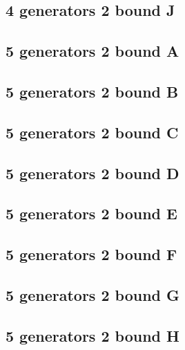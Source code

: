\documentclass{TC}
\begin{document}
{\subsection{4 generators 2 bound J}

\newpage



\subsection{5 generators 2 bound A}

\newpage

\subsection{5 generators 2 bound B}

\newpage

\subsection{5 generators 2 bound C}

\newpage

\subsection{5 generators 2 bound D}

\newpage

\subsection{5 generators 2 bound E}

\newpage

\subsection{5 generators 2 bound F}

\newpage

\subsection{5 generators 2 bound G}

\newpage

\subsection{5 generators 2 bound H}

\newpage

}
\end{document}
